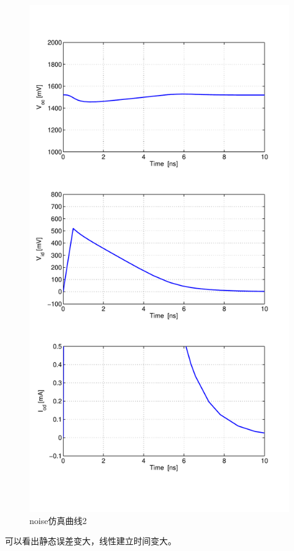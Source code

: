\documentclass[a4paper]{article}
\begin{document}
\begin{figure}[htb]
    \begin{center}
        \includegraphics[width=\textwidth]{slow/tran2.pdf}
    \end{center}
    \caption{noise仿真曲线2}
    \label{slowtran2}
\end{figure}
可以看出静态误差变大，线性建立时间变大。
\end{document}
